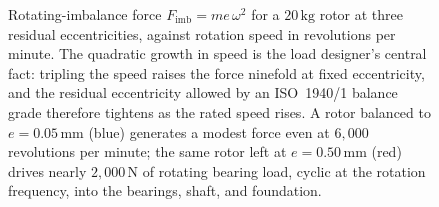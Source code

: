 \begin{figure}[htbp]
\centering
{}
\caption[Imbalance force versus rotation speed]{Rotating-imbalance
force $F_{\text{imb}}=m e\,\omega^{2}$ for a $20\,\si{\kilogram}$
rotor at three residual eccentricities, against rotation speed in
revolutions per minute. The quadratic growth in speed is the load
designer's central fact: tripling the speed raises the force ninefold
at fixed eccentricity, and the residual eccentricity allowed by an
ISO~1940/1 balance grade therefore tightens as the rated speed rises.
A rotor balanced to $e=0.05\,\si{\milli\meter}$ (blue) generates a
modest force even at $6{,}000$ revolutions per minute; the same rotor
left at $e=0.50\,\si{\milli\meter}$ (red) drives nearly
$2{,}000\,\si{\newton}$ of rotating bearing load, cyclic at the
rotation frequency, into the bearings, shaft, and foundation.}
\label{fig:vol03ch04:imbalance-force}
\end{figure}
